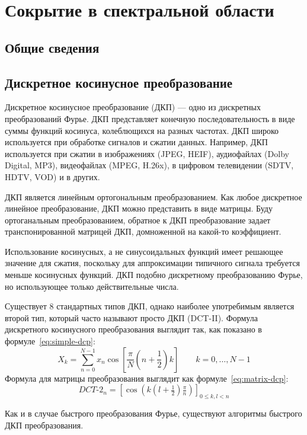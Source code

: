 \chapter{Сокрытие в спектральной области}
\section{Общие сведения}

\section{Дискретное косинусное преобразование}
Дискретное косинусное преобразование (ДКП) --- одно из дискретных преобразований Фурье.
ДКП представляет конечную последовательность в виде суммы функций косинуса,
колеблющихся на разных частотах. ДКП широко используется при обработке сигналов и сжатии данных.
Например, ДКП используется при сжатии в изображениях (JPEG, HEIF), аудиофайлах (Dolby Digital, MP3),
видеофайлах (MPEG, H.26x), в цифровом телевидении (SDTV, HDTV, VOD) и в других.

ДКП является линейным ортогональным преобразованием. Как любое дискретное линейное преобразование,
ДКП можно представить в виде матрицы. Буду ортоганальным преобразованием, обратное к ДКП преобразование
задает транспонированной матрицей ДКП, домноженной на какой-то коэффициент.

Использование косинусных, а не синусоидальных функций имеет решающее значение для сжатия,
поскольку для аппроксимации типичного сигнала требуется меньше косинусных функций.
ДКП подобно дискретному преобразованию Фурье, но использующее только действительные числа.

Существует 8 стандартных типов ДКП, однако наиболее употребимым является второй тип,
который часто называют просто ДКП (DCT-II).
Формула дискретного косинусного преобразования выглядит так,
как показано в формуле~\ref{eq:simple-dcp}:
\begin{equation} \label{eq:simple-dcp}
    X_k = \sum_{n=0}^{N-1} x_n \cos \left[\frac{\pi}{N} \left(n+\frac{1}{2}\right) k \right] \quad \quad k = 0, \dots, N-1    
\end{equation}
Формула для матрицы преобразования выглядит как формуле~\ref{eq:matrix-dcp}:
\begin{equation} \label{eq:matrix-dcp}
    {DCT}\text{-}2_n= \left[\cos (k(l+\tfrac{1}{2})\tfrac{\pi}{n})\right]_{0\leq k,l<n}    
\end{equation}

Как и в случае быстрого преобразования Фурье, существуют алгоритмы быстрого ДКП преобразования.

